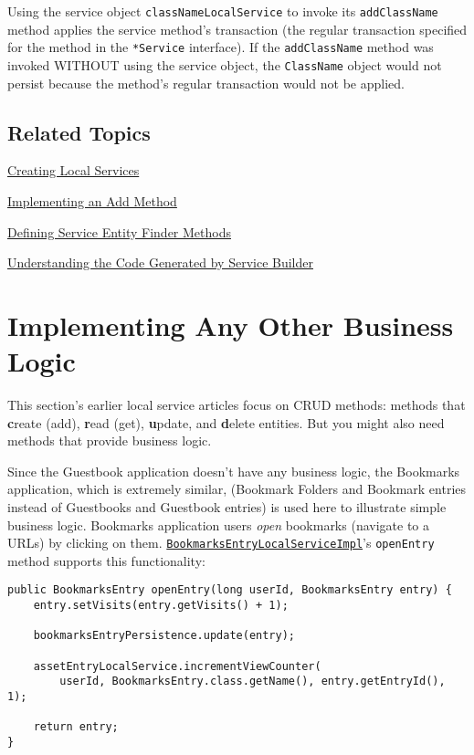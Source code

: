 Using the service object \texttt{classNameLocalService} to invoke its
\texttt{addClassName} method applies the service method's transaction
(the regular transaction specified for the method in the
\texttt{*Service} interface). If the \texttt{addClassName} method was
invoked WITHOUT using the service object, the \texttt{ClassName} object
would not persist because the method's regular transaction would not be
applied.

\section{Related Topics}\label{related-topics-19}

\href{/docs/7-2/appdev/-/knowledge_base/a/business-logic-with-service-builder}{Creating
Local Services}

\href{/docs/7-2/appdev/-/knowledge_base/a/implementing-an-add-method}{Implementing
an Add Method}

\href{/docs/7-2/appdev/-/knowledge_base/a/defining-service-entity-finder-methods}{Defining
Service Entity Finder Methods}

\href{/docs/7-2/appdev/-/knowledge_base/a/understanding-the-code-generated-by-service-builder}{Understanding
the Code Generated by Service Builder}

\chapter{Implementing Any Other Business
Logic}\label{implementing-any-other-business-logic}

This section's earlier local service articles focus on CRUD methods:
methods that \textbf{c}reate (add), \textbf{r}ead (get),
\textbf{u}pdate, and \textbf{d}elete entities. But you might also need
methods that provide business logic.

Since the Guestbook application doesn't have any business logic, the
Bookmarks application, which is extremely similar, (Bookmark Folders and
Bookmark entries instead of Guestbooks and Guestbook entries) is used
here to illustrate simple business logic. Bookmarks application users
\emph{open} bookmarks (navigate to a URLs) by clicking on them.
\href{https://github.com/liferay/liferay-portal/blob/7.2.x/modules/apps/bookmarks/bookmarks-service/src/main/java/com/liferay/bookmarks/service/impl/BookmarksEntryLocalServiceImpl.java}{\texttt{BookmarksEntryLocalServiceImpl}}'s
\texttt{openEntry} method supports this functionality:

\begin{verbatim}
public BookmarksEntry openEntry(long userId, BookmarksEntry entry) {
    entry.setVisits(entry.getVisits() + 1);

    bookmarksEntryPersistence.update(entry);

    assetEntryLocalService.incrementViewCounter(
        userId, BookmarksEntry.class.getName(), entry.getEntryId(), 1);

    return entry;
}
\end{verbatim}

